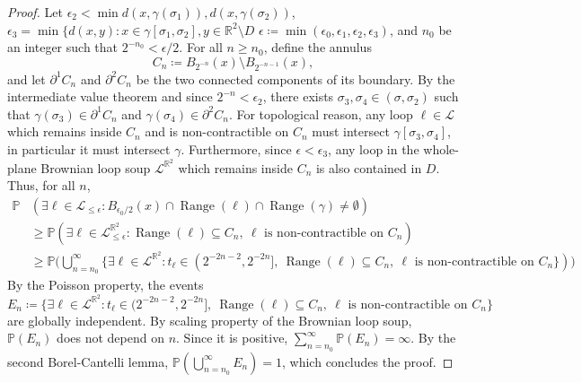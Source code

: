 \documentclass[11pt]{article}
\DeclareMathOperator{\Range}{Range}
\begin{document}
\begin{proof}
  Let $\epsilon_2<\min d( x, \gamma(\sigma_1)  ), d( x, \gamma(\sigma_2)  )$,
$\epsilon_3=\min \{d(x,y): x\in \gamma[\sigma_1,\sigma_2], y \in \mathbb{R}^2\setminus D $
   $\epsilon\coloneqq \min(\epsilon_0,\epsilon_1,\epsilon_2,\epsilon_3)$, and $n_0$ be an integer such that $2^{-n_0}<\epsilon/2$.
  For all $n\geq n_0$, define the annulus \[C_n\coloneqq B_{2^{-n}}(x )\setminus B_{2^{-n-1}}(x),\]
  and let $\partial^1 C_n$ and $\partial^2 C_n$ be the two connected components of its boundary.
  By the intermediate value theorem and since $2^{-n}<\epsilon_2$, there exists $\sigma_3,\sigma_4\in (\sigma,\sigma_2)$ such that $\gamma(\sigma_3)\in \partial^1 C_n$
  and $\gamma(\sigma_4)\in \partial^2 C_n$.
  For topological reason, any loop $\ell\in \mathscr{L}$ which remains inside $C_n$ and is non-contractible on $C_n$ must intersect $\gamma[\sigma_3,\sigma_4]$, in particular it must intersect $\gamma$. Furthermore, since $\epsilon<\epsilon_3$, any loop in the whole-plane Brownian loop soup $\mathcal{L}^{\mathbb{R}^2}$ which remains inside $C_n$ is also contained in $D$.
  Thus, for all $n$,
  \begin{align*} \mathbb{P}&(\exists
  \ell \in \mathcal{L}_{\leq \epsilon} :B_{\epsilon_0/2}(x)\cap \Range(\ell) \cap \Range(\gamma)\neq \emptyset
  )\\
  &\geq \mathbb{P}
  (
  \exists
  \ell \in \mathcal{L}^{\mathbb{R}^2}_{\leq \epsilon} : \Range(\ell)\subseteq C_n, \ \ell \mbox{ is non-contractible on $C_n$})\\
  &\geq \mathbb{P}
  \Big(
  \bigcup_{n=n_0}^\infty
  \{
  \exists
  \ell \in \mathcal{L}^{\mathbb{R}^2}: t_\ell\in (2^{-2n-2}, 2^{-2n}],\ \Range(\ell)\subseteq C_n, \ \ell \mbox{ is non-contractible on $C_n$} \} )
  \Big)
  \end{align*}
  By the Poisson property, the events
  \[ E_n \coloneqq
  \{
  \exists
  \ell \in \mathcal{L}^{\mathbb{R}^2} : t_\ell\in (2^{-2n-2}, 2^{-2n}],\ \Range(\ell)\subseteq C_n, \ \ell \mbox{ is non-contractible on $C_n$} \}
  \]
  are globally independent. By scaling property of the Brownian loop soup, $\mathbb{P}(E_n)$ does not depend on $n$. Since it is positive, $\sum_{n=n_0}^\infty \mathbb{P}(E_n)=\infty$. By the second Borel-Cantelli lemma, $\mathbb{P}(\bigcup_{n=n_0}^\infty E_{n})=1$, which concludes the proof.
\end{proof}
\end{document}
